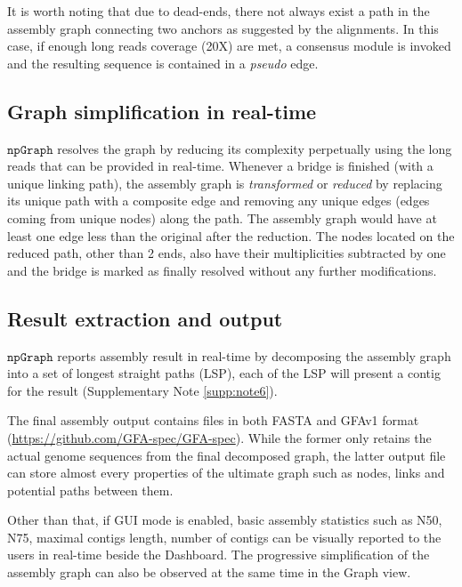 \documentclass[10pt,twocolumn,twoside]{genpaper}
\newcommand{\npgraph}{$\mathtt{npGraph}$}
\begin{document}
It is worth noting that due to dead-ends, there not always exist a path in the assembly graph connecting two anchors as suggested by the alignments. In this case, if enough long reads coverage (20X) are met, a consensus module is invoked and the resulting sequence is contained in a \emph{pseudo} edge.
\subsection*{Graph simplification in real-time}
\npgraph{} resolves the graph by reducing its complexity perpetually using the long reads that can be provided in real-time.
Whenever a bridge is finished (with a unique linking path), the assembly graph is \emph{transformed} or \emph{reduced} by replacing its unique path with a composite edge and removing any unique edges (edges coming from unique nodes) along the path. The assembly graph would have at least one edge less than the original after the reduction. The nodes located on the reduced path, other than 2 ends, also have their multiplicities subtracted by one and the bridge is marked as finally resolved without any further modifications. 

\subsection*{Result extraction and output}
\npgraph{} reports assembly result in real-time by decomposing the assembly graph into a set of longest straight paths (LSP), each of the LSP will present a contig for the result (Supplementary Note \ref{supp:note6}).

The final assembly output contains files in both FASTA and GFAv1 format (\url{https://github.com/GFA-spec/GFA-spec}). While the former only retains the actual genome sequences from the final decomposed graph, the latter output file can store almost every properties of the ultimate graph such as nodes, links and potential paths between them.

Other than that, if GUI mode is enabled, basic assembly statistics such as N50, N75, maximal contigs length, number of contigs can be visually reported to the users in real-time beside the Dashboard. The progressive simplification of the assembly graph can also be observed at the same time in the Graph view.


 
\end{document}
